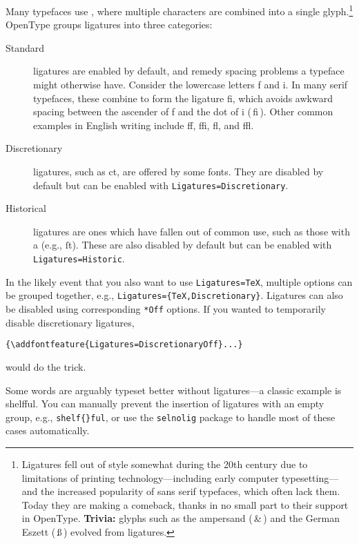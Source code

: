 Many typefaces use , where multiple characters are combined
into a single glyph.\punckern\footnote{Ligatures fell out
of style somewhat during the 20{th}
century due to limitations of printing technology---including early
computer typesetting---and the increased popularity of sans serif typefaces,
which often lack them.
Today they are making a comeback,
thanks in no small part to their support in OpenType.
\textbf{Trivia:} glyphs such as the ampersand
(\,\&\,) and the German Eszett (\,ß\,) evolved
from ligatures.}
OpenType groups ligatures into three categories:
\begin{description}
\item[Standard] ligatures are enabled by default, and remedy spacing problems
    a typeface might otherwise have. Consider the lowercase letters f
    and i.
    In many serif typefaces, these combine
    to form the ligature fi, which avoids awkward spacing between the
    ascender of f and the dot of i
    { (\,fi\,).}
    Other common examples in English writing include ff,
    ffi, fl, and ffl.
\item[Discretionary] ligatures, such as
    {ct},
    are offered by some fonts.
    They are disabled by default
    but can be enabled with
    \verb|Ligatures=Discretionary|.
\item[Historical] ligatures are ones which have fallen out of common use,
    such as those with a  (e.g.,
    {ſt}).
    These are also disabled by default
    but can be enabled with \verb|Ligatures=Historic|.
\end{description}
In the likely event that you also want to use \verb|Ligatures=TeX|,
multiple options can be grouped together, e.g.,
\verb|Ligatures={TeX,Discretionary}|.
Ligatures can also be disabled using corresponding \verb|*Off|
options. If you wanted to temporarily disable discretionary ligatures,
\begin{leftfigure}
\begin{lstlisting}
{\addfontfeature{Ligatures=DiscretionaryOff}...}
\end{lstlisting}
\end{leftfigure}
would do the trick.

Some words are arguably typeset better without ligatures---a classic example
is shelfful.\punckern{}
You can manually prevent the insertion of ligatures with an empty group,
e.g., \verb|shelf{}ful|,
or use the \texttt{selnolig} package to handle most of these cases automatically.

